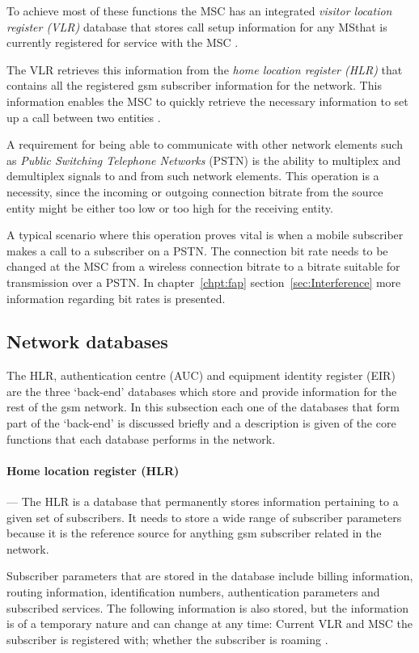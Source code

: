 To achieve most of these functions the MSC has an integrated \emph{visitor location register (VLR)} database that stores call setup information for any \gls{MS}that is currently registered for service with the MSC \cite{GSM92,wirelesstelcoMullet}. 

The VLR retrieves this information from the \emph{home location register (HLR)} that contains all the registered \gls{gsm} subscriber information for the network. This information enables the MSC to quickly retrieve the necessary information to set up a call between two entities \cite{GSMSysEngin,GSMSecurInTeleNetwork}.

A requirement for being able to communicate with other network elements such as \emph{Public Switching Telephone Networks} (PSTN) is the ability to multiplex and demultiplex signals to and from such network elements. This operation is a necessity, since the incoming or outgoing connection bitrate from the source entity might be either too low or too high for the receiving entity.

A typical scenario where this operation proves vital is when a mobile subscriber makes a call to a subscriber on a PSTN\@. The connection bit rate needs to be changed at the MSC from a wireless connection bitrate to a bitrate suitable for transmission over a PSTN\@. In chapter~\ref{chpt:fap} section~\ref{sec:Interference} more information regarding bit rates is presented.

\subsection{Network databases}
The HLR, authentication centre (AUC) and equipment identity register (EIR) are the three `back-end' databases which store and provide information for the rest of the \gls{gsm} network. In this subsection each one of the databases that form part of the `back-end' is discussed briefly and a description is given of the core functions that each database performs in the network.

\paragraph{Home location register (HLR)}
--- The HLR is a database that permanently stores information pertaining to a given set of subscribers. It needs to store a wide range of subscriber parameters because it is the reference source for anything \gls{gsm} subscriber related in the network. 

Subscriber parameters that are stored in the database include billing information, routing information, identification numbers, authentication parameters and subscribed services. The following information is also stored, but the information is of a temporary nature and can change at any time: Current VLR and MSC the subscriber is registered with; whether the subscriber is roaming \cite{GSMSysEngin}.

